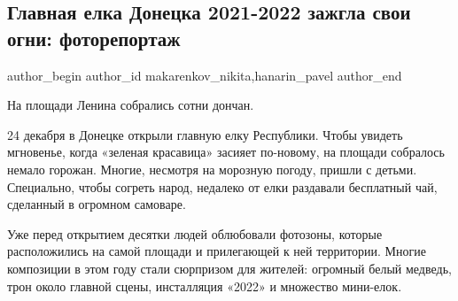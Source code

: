  
 
 
 

\subsection{Главная елка Донецка 2021-2022 зажгла свои огни: фоторепортаж}
\label{sec:24_12_2021.stz.news.ru.kp.1.doneck_jolka}

\ifcmt
 author_begin
   author_id makarenkov_nikita,hanarin_pavel
 author_end
\fi

На площади Ленина собрались сотни дончан.


24 декабря в Донецке открыли главную елку Республики. Чтобы увидеть мгновенье,
когда «зеленая красавица» засияет по-новому, на площади собралось немало
горожан. Многие, несмотря на морозную погоду, пришли с детьми. Специально,
чтобы согреть народ, недалеко от елки раздавали бесплатный чай, сделанный в
огромном самоваре.

Уже перед открытием десятки людей облюбовали фотозоны, которые расположились на
самой площади и прилегающей к ней территории. Многие композиции в этом году
стали сюрпризом для жителей: огромный белый медведь, трон около главной сцены,
инсталляция «2022» и множество мини-елок.

